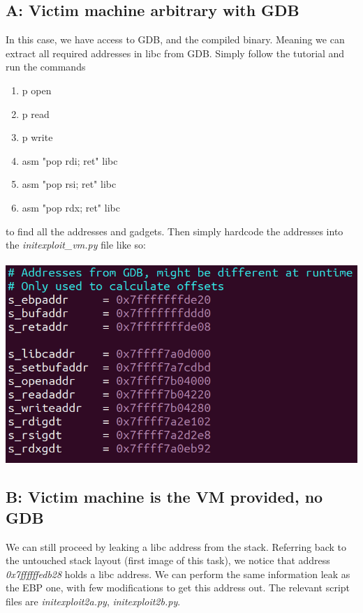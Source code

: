 \documentclass[12pt]{article}
\begin{document}
\subsection*{A: Victim machine arbitrary with GDB}
In this case, we have access to GDB, and the compiled binary.
Meaning we can extract all required addresses in libc from GDB.
Simply follow the tutorial and run the commands
\begin{enumerate}
    \item p open
    \item p read
    \item p write
    \item asm "pop rdi; ret" libc
    \item asm "pop rsi; ret" libc
    \item asm "pop rdx; ret" libc
\end{enumerate}
to find all the addresses and gadgets. Then simply hardcode the addresses into the \emph{initexploit\_vm.py} file like so:\\\\
\includegraphics[scale=0.7]{./a2/rop/hclibc.PNG}\\

\subsection*{B: Victim machine is the VM provided, no GDB}
We can still proceed by leaking a libc address from the stack.
Referring back to the untouched stack layout (first image of this task), we notice that address \emph{0x7ffffffedb28} holds a libc address.
We can perform the same information leak as the EBP one, with few modifications to get this address out.
The relevant script files are \emph{initexploit2a.py}, \emph{initexploit2b.py}.\\\\
\end{document}

